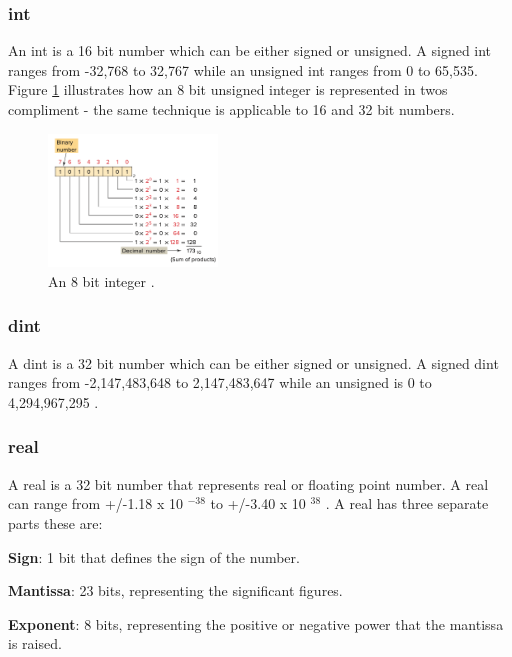     \subsubsection{\acrfull{int}}
        An \acrshort{int} is a 16 bit number which can be either signed or unsigned. A signed \acrshort{int} ranges from -32,768 to 32,767 while an unsigned \acrshort{int} ranges from 0 to 65,535\cite{dataTypesSiemens}. Figure \ref{fig:int} illustrates how an 8 bit unsigned integer is represented in twos compliment - the same technique is applicable to 16 and 32 bit numbers.
        \begin{figure}[H]
            \centering
            \includegraphics[width = 0.4\textwidth]{2_images/int.png}
            \caption{An 8 bit integer \cite{petruzella2017programmable}.}
            \label{fig:int}
        \end{figure}         
        
    
    \subsubsection{\acrfull{dint}}
        A \acrshort{dint} is a 32 bit number which can be either signed or unsigned. A signed \acrshort{dint} ranges from -2,147,483,648 to 2,147,483,647 while an unsigned is 0 to 4,294,967,295 \cite{dataTypesSiemens}. 
        
        \subsubsection{\acrfull{real}}
        A \acrshort{real} is a 32 bit number that represents real or floating point number. A \acrshort{real} can range from +/-1.18 x 10 $^{-38}$ to +/-3.40 x 10 $^{38}$ \cite{dataTypesSiemens}. A \acrshort{real} has three separate parts these are\cite{petruzella2017programmable}:
        
        \begin{description}
            \item\textbf{Sign}: 1 bit that defines the sign of the number.
            \item\textbf{Mantissa}: 23 bits, representing the significant figures.
            \item\textbf{Exponent}: 8 bits, representing the positive or negative power that the mantissa is raised.
        \end{description}
        

